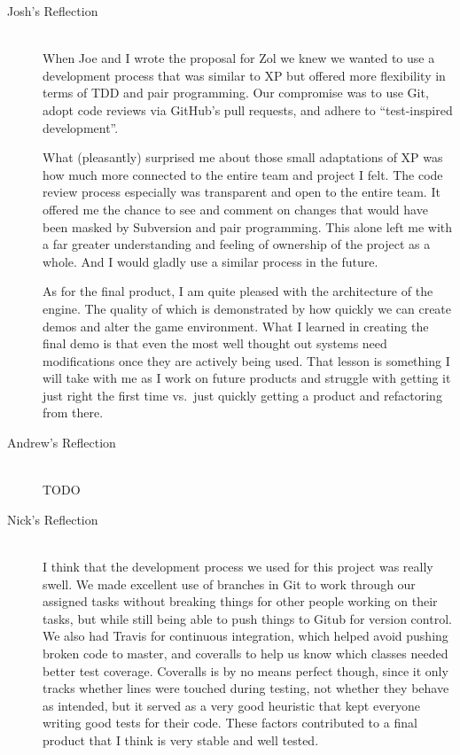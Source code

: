 \documentclass{article}
\begin{document}
		\begin{description}
			\item[Josh's Reflection] \hfill \\
			When Joe and I wrote the proposal for Zol we knew we wanted to
			use a development process that was similar to XP but offered more
			flexibility in terms of TDD and pair programming. Our compromise
			was to use Git, adopt code reviews via GitHub's pull requests,
			and adhere to ``test-inspired development''.

			What (pleasantly) surprised me about those small adaptations of
			XP was how much more connected to the entire team and project I
			felt. The code review process especially was transparent and
			open to the entire team. It offered me the chance to see and
			comment on changes that would have been masked by Subversion and
			pair programming. This alone left me with a far greater
			understanding and feeling of ownership of the project as a whole.
			And I would gladly use a similar process in the future.

			As for the final product, I am quite pleased with the architecture
			of the engine. The quality of which is demonstrated by how
			quickly we can create demos and alter the game environment. What
			I learned in creating the final demo is that even the most well
			thought out systems need modifications once they are actively
			being used. That lesson is something I will take with me as
			I work on future products and struggle with getting it just right
			the first time vs.\ just quickly getting a product and refactoring
			from there.

			\item[Andrew's Reflection] \hfill \\
			TODO

			\item[Nick's Reflection] \hfill \\
			I think that the development process we used for this project was
			really swell. We made excellent use of branches in Git to work through
			our assigned tasks without breaking things for other people working on
			their tasks, but while still being able to push things to Gitub for
			version control. We also had Travis for continuous integration, which
			helped avoid pushing broken code to master, and coveralls to help us
			know which classes needed better test coverage. Coveralls is by no means
			perfect though, since it only tracks whether lines were touched during
			testing, not whether they behave as intended, but it served as a very
			good heuristic that kept everyone writing good tests for their code.
			These factors contributed to a final product that I think is very stable
			and well tested.


\end{description}
\end{document}
